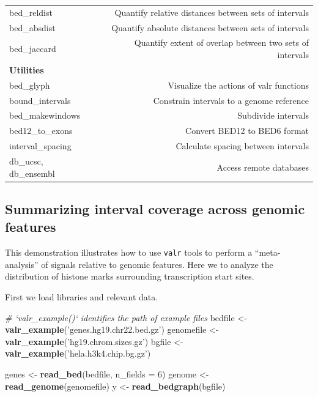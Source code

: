 \documentclass[9pt,a4paper]{extarticle}
\renewcommand{\KeywordTok}[1]{\textbf{{#1}}}
\renewcommand{\DataTypeTok}[1]{\textcolor[rgb]{0.50,0.00,0.00}{{#1}}}
\renewcommand{\DecValTok}[1]{\textcolor[rgb]{0.00,0.00,1.00}{{#1}}}
\renewcommand{\StringTok}[1]{\textcolor[rgb]{0.87,0.00,0.00}{{#1}}}
\renewcommand{\CommentTok}[1]{\textcolor[rgb]{0.50,0.50,0.50}{\textit{{#1}}}}
\renewcommand{\NormalTok}[1]{{#1}}
\begin{document}
\begin{table}[h!]
\begin{tabular}{lr}
  bed\_reldist & Quantify relative distances between sets of intervals \\
  bed\_absdist & Quantify absolute distances between sets of intervals \\
  bed\_jaccard &Quantify extent of overlap between two sets of intervals \\
\bfseries Utilities &  \\ 
  bed\_glyph & Visualize the actions of valr functions \\ 
  bound\_intervals & Constrain intervals to a genome reference \\
  bed\_makewindows & Subdivide intervals \\
  bed12\_to\_exons & Convert BED12 to BED6 format \\
  interval\_spacing & Calculate spacing between intervals \\
  db\_ucsc, db\_ensembl & Access remote databases \\
  \end{tabular}
\end{table}

\subsection*{Summarizing interval coverage across genomic features}

This demonstration illustrates how to use \texttt{valr} tools to perform
a ``meta-analysis'' of signals relative to genomic features. Here we to
analyze the distribution of histone marks surrounding transcription
start sites.

First we load libraries and relevant data.

\begin{Highlighting}[]
\CommentTok{# `valr_example()` identifies the path of example files}
\NormalTok{bedfile <-}\StringTok{ }\KeywordTok{valr_example}\NormalTok{(}\StringTok{'genes.hg19.chr22.bed.gz'}\NormalTok{)}
\NormalTok{genomefile <-}\StringTok{ }\KeywordTok{valr_example}\NormalTok{(}\StringTok{'hg19.chrom.sizes.gz'}\NormalTok{)}
\NormalTok{bgfile  <-}\StringTok{ }\KeywordTok{valr_example}\NormalTok{(}\StringTok{'hela.h3k4.chip.bg.gz'}\NormalTok{)}

\NormalTok{genes <-}\StringTok{ }\KeywordTok{read_bed}\NormalTok{(bedfile, }\DataTypeTok{n_fields =} \DecValTok{6}\NormalTok{)}
\NormalTok{genome <-}\StringTok{ }\KeywordTok{read_genome}\NormalTok{(genomefile)}
\NormalTok{y <-}\StringTok{ }\KeywordTok{read_bedgraph}\NormalTok{(bgfile)}
\end{Highlighting}
\end{document}
